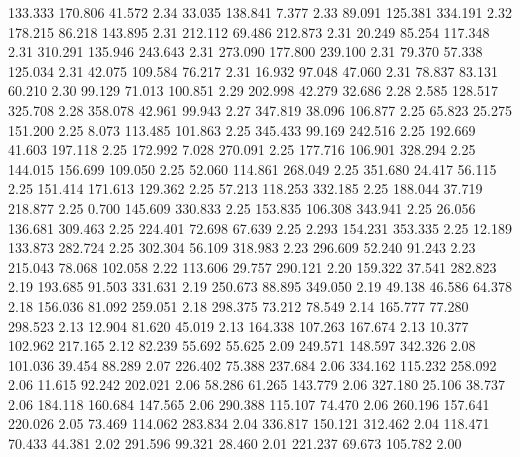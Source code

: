  133.333  170.806   41.572         2.34
  33.035  138.841    7.377         2.33
  89.091  125.381  334.191         2.32
 178.215   86.218  143.895         2.31
 212.112   69.486  212.873         2.31
  20.249   85.254  117.348         2.31
 310.291  135.946  243.643         2.31
 273.090  177.800  239.100         2.31
  79.370   57.338  125.034         2.31
  42.075  109.584   76.217         2.31
  16.932   97.048   47.060         2.31
  78.837   83.131   60.210         2.30
  99.129   71.013  100.851         2.29
 202.998   42.279   32.686         2.28
   2.585  128.517  325.708         2.28
 358.078   42.961   99.943         2.27
 347.819   38.096  106.877         2.25
  65.823   25.275  151.200         2.25
   8.073  113.485  101.863         2.25
 345.433   99.169  242.516         2.25
 192.669   41.603  197.118         2.25
 172.992    7.028  270.091         2.25
 177.716  106.901  328.294         2.25
 144.015  156.699  109.050         2.25
  52.060  114.861  268.049         2.25
 351.680   24.417   56.115         2.25
 151.414  171.613  129.362         2.25
  57.213  118.253  332.185         2.25
 188.044   37.719  218.877         2.25
   0.700  145.609  330.833         2.25
 153.835  106.308  343.941         2.25
  26.056  136.681  309.463         2.25
 224.401   72.698   67.639         2.25
   2.293  154.231  353.335         2.25
  12.189  133.873  282.724         2.25
 302.304   56.109  318.983         2.23
 296.609   52.240   91.243         2.23
 215.043   78.068  102.058         2.22
 113.606   29.757  290.121         2.20
 159.322   37.541  282.823         2.19
 193.685   91.503  331.631         2.19
 250.673   88.895  349.050         2.19
  49.138   46.586   64.378         2.18
 156.036   81.092  259.051         2.18
 298.375   73.212   78.549         2.14
 165.777   77.280  298.523         2.13
  12.904   81.620   45.019         2.13
 164.338  107.263  167.674         2.13
  10.377  102.962  217.165         2.12
  82.239   55.692   55.625         2.09
 249.571  148.597  342.326         2.08
 101.036   39.454   88.289         2.07
 226.402   75.388  237.684         2.06
 334.162  115.232  258.092         2.06
  11.615   92.242  202.021         2.06
  58.286   61.265  143.779         2.06
 327.180   25.106   38.737         2.06
 184.118  160.684  147.565         2.06
 290.388  115.107   74.470         2.06
 260.196  157.641  220.026         2.05
  73.469  114.062  283.834         2.04
 336.817  150.121  312.462         2.04
 118.471   70.433   44.381         2.02
 291.596   99.321   28.460         2.01
 221.237   69.673  105.782         2.00
